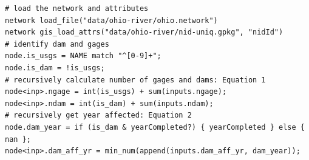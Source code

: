 \documentclass{article}
\begin{document}
\begin{lstlisting}[float,label=lst:sample-code,caption=Example NADI Code for counting number of Dam/Gages upstream and obtaining first year of dam construction]
# load the network and attributes
network load_file("data/ohio-river/ohio.network")
network gis_load_attrs("data/ohio-river/nid-uniq.gpkg", "nidId")
# identify dam and gages
node.is_usgs = NAME match "^[0-9]+";
node.is_dam = !is_usgs;
# recursively calculate number of gages and dams: Equation 1
node<inp>.ngage = int(is_usgs) + sum(inputs.ngage);
node<inp>.ndam = int(is_dam) + sum(inputs.ndam);
# recursively get year affected: Equation 2
node.dam_year = if (is_dam & yearCompleted?) { yearCompleted } else { nan };
node<inp>.dam_aff_yr = min_num(append(inputs.dam_aff_yr, dam_year));
\end{lstlisting}
\end{document}
